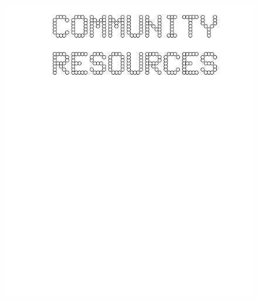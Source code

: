 \documentclass[17pt]{extreport}
\begin{document}
	\begin{figure}
		\centering
		\includegraphics[width=6.25in]{imageserver/uploadimages/community.png}
	\end{figure}
	
\end{document}
